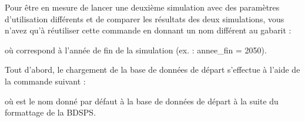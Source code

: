 \documentclass[letterpaper,10pt,french]{sphinxmanual}
\begin{document}
\begin{DUlineblock}{0em}
\item[] 
\end{DUlineblock}

Pour être en mesure de lancer une deuxième simulation avec des paramètres d’utilisation différents et de comparer les résultats des deux simulations,
vous n’avez qu’à réutiliser cette commande en donnant un nom différent au gabarit :

\begin{sphinxVerbatim}[commandchars=\\\{\}]
  
\end{sphinxVerbatim}

où  correspond à l’année de fin de la simulation (ex. : annee\_fin = 2050).


Tout d’abord, le chargement de la base de données de départ s’effectue à l’aide de la commande suivant :

\begin{sphinxVerbatim}[commandchars=\\\{\}]
\end{sphinxVerbatim}

où  est le nom donné par défaut à la base de données de départ à la suite du formattage de la BDSPS.

\end{document}
